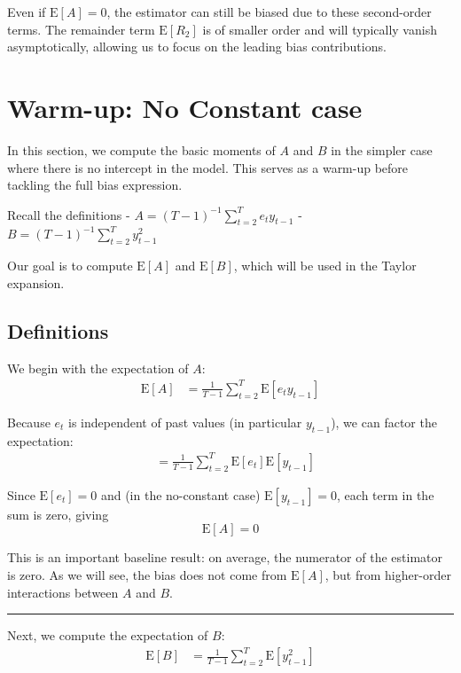 \documentclass[11pt]{article}
\begin{document}
Even if \(\text{E}[A] = 0\), the estimator can still be biased due to
these second-order terms. The remainder term \(\text{E}[R_2]\) is of
smaller order and will typically vanish asymptotically, allowing us to
focus on the leading bias contributions.

    \section{Warm-up: No Constant case}\label{warm-up-no-constant-case}

In this section, we compute the basic moments of \(A\) and \(B\) in the
simpler case where there is no intercept in the model. This serves as a
warm-up before tackling the full bias expression.

Recall the definitions - \(A = (T-1)^{-1}\sum_{t=2}^{T} e_t y_{t-1}\) -
\(B = (T-1)^{-1}\sum_{t=2}^{T} y_{t-1}^2\)

Our goal is to compute \(\text{E}[A]\) and \(\text{E}[B]\), which will
be used in the Taylor expansion.

\subsection{Definitions}\label{definitions}

We begin with the expectation of \(A\): \[
\begin{aligned}
\text{E}\left[A\right]
&=\frac{1}{T-1}\sum_{t=2}^{T} \text{E}\left[e_t y_{t-1}\right]
\end{aligned}
\]

Because \(e_t\) is independent of past values (in particular
\(y_{t-1}\)), we can factor the expectation: \[
\begin{aligned}
&=\frac{1}{T-1}\sum_{t=2}^{T} \text{E}\left[e_t\right]\text{E}\left[y_{t-1}\right]
\end{aligned}
\]

Since \(\text{E}[e_t]=0\) and (in the no-constant case)
\(\text{E}[y_{t-1}]=0\), each term in the sum is zero, giving \[
\text{E}\left[A\right]=0
\]

This is an important baseline result: on average, the numerator of the
estimator is zero. As we will see, the bias does not come from
\(\text{E}[A]\), but from higher-order interactions between \(A\) and
\(B\).

\begin{center}\rule{0.5\linewidth}{0.5pt}\end{center}

Next, we compute the expectation of \(B\): \[
\begin{aligned}
\text{E}\left[B\right]
&=\frac{1}{T-1}\sum_{t=2}^{T} \text{E}\left[y_{t-1}^2\right]
\end{aligned}
\]
\end{document}
